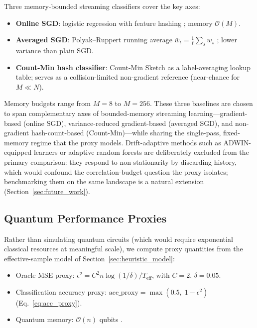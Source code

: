 \documentclass[sensors,article,submit,pdftex,moreauthors]{Definitions/mdpi}
\newcommand{\bigO}{\mathcal{O}}
\newcommand{\Teff}{T_{\mathrm{eff}}}
\providecommand{\DIFadd}[1]{{\protect\color{blue}#1}} %
\providecommand{\DIFaddbegin}{} %
\providecommand{\DIFaddend}{} %
\begin{document}
Three memory-bounded streaming classifiers cover the key axes:
\begin{itemize}
    \item \textbf{Online SGD}: logistic regression with feature hashing \citep{weinberger2009featurehashing, shalev2012online}; memory $\bigO(M)$.
    \item \textbf{Averaged SGD}: Polyak--Ruppert running average $\bar{w}_t = \frac{1}{t}\sum_s w_s$ \citep{polyak1992averaging}; lower variance than plain SGD.
    \item \textbf{Count-Min hash classifier}: Count-Min Sketch \citep{cormode2005improved} as a label-averaging lookup table; serves as a collision-limited non-gradient reference (near-chance for $M \ll N$).
\end{itemize}
Memory budgets range from $M = 8$ to $M = 256$. \DIFaddbegin \DIFadd{These three baselines are chosen to span complementary axes of bounded-memory streaming learning---gradient-based (online SGD), variance-reduced gradient-based (averaged SGD), and non-gradient hash-count-based (Count-Min)---while sharing the single-pass, fixed-memory regime that the proxy models. Drift-adaptive methods such as ADWIN-equipped learners or adaptive random forests }\citep{bifet2007adwin, gomes2017adaptiverf} \DIFadd{are deliberately excluded from the primary comparison: they respond to non-stationarity by discarding history, which would confound the correlation-budget question the proxy isolates; benchmarking them on the same landscape is a natural extension (Section~\ref{sec:future_work}).
}\DIFaddend 

\subsection{Quantum Performance Proxies}
\label{sec:quantum_proxies}

Rather than simulating quantum circuits (which would require exponential classical resources at meaningful scale), we compute proxy quantities from the effective-sample model of Section~\ref{sec:heuristic_model}:
\begin{itemize}
    \item Oracle MSE proxy: $\epsilon^2 = C^2 n \log(1/\delta) / \Teff$, with $C = 2$, $\delta = 0.05$.
    \item Classification accuracy proxy: $\mathrm{acc\_proxy} = \max(0.5,\; 1 - \epsilon^2)$ (Eq.~\ref{eq:acc_proxy}).
    \item Quantum memory: $\bigO(n)$ qubits \citep{zhao2026exponential}.
\end{itemize}
\end{document}
